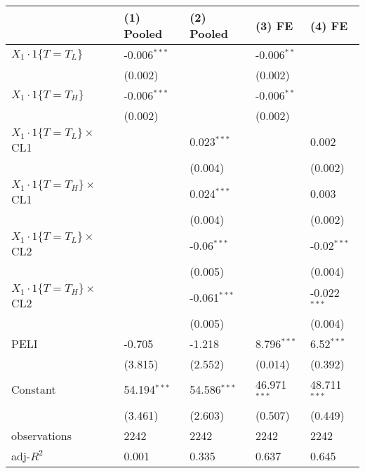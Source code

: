 \begin{tabular}{lllll}
\hline
 & (1) Pooled & (2) Pooled & (3) FE & (4) FE \\
\hline
$X_1\cdot1\{T=T_L\}$ & -0.006$^{***}$ &  & -0.006$^{**}$ &  \\
 & (0.002) &  & (0.002) &  \\
$X_1\cdot1\{T=T_H\}$ & -0.006$^{***}$ &  & -0.006$^{**}$ &  \\
 & (0.002) &  & (0.002) &  \\
$X_1\cdot1\{T=T_L\}\times$CL1 &  & 0.023$^{***}$ &  & 0.002 \\
 &  & (0.004) &  & (0.002) \\
$X_1\cdot1\{T=T_H\}\times$CL1 &  & 0.024$^{***}$ &  & 0.003 \\
 &  & (0.004) &  & (0.002) \\
$X_1\cdot1\{T=T_L\}\times$CL2 &  & -0.06$^{***}$ &  & -0.02$^{***}$ \\
 &  & (0.005) &  & (0.004) \\
$X_1\cdot1\{T=T_H\}\times$CL2 &  & -0.061$^{***}$ &  & -0.022$^{***}$ \\
 &  & (0.005) &  & (0.004) \\
PELI & -0.705 & -1.218 & 8.796$^{***}$ & 6.52$^{***}$ \\
 & (3.815) & (2.552) & (0.014) & (0.392) \\
Constant & 54.194$^{***}$ & 54.586$^{***}$ & 46.971$^{***}$ & 48.711$^{***}$ \\
 & (3.461) & (2.603) & (0.507) & (0.449) \\\hline

observations & 2242 & 2242 & 2242 & 2242 \\
adj-$R^2$ & 0.001 & 0.335 & 0.637 & 0.645 \\
\hline
\end{tabular}
